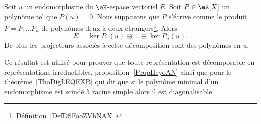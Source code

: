 \begin{theorem}       \label{ThoDecompNoyayzzMWod}
    Soit \( u\) un endomorphisme du \( \eK\)-espace vectoriel \( E\). Soit \( P\in\eK[X]\) un polynôme tel que \( P(u)=0\). Nous supposons que \( P\) s'écrive comme le produit \( P=P_1\ldots P_n\) de polynômes deux à deux étrangers\footnote{Définition~\ref{DefDSFooZVbNAX}.}. Alors
    \begin{equation}
        E=\ker P_1(u)\oplus\ldots\oplus\ker P_n(u).
    \end{equation}
    De plus les projecteurs associés à cette décomposition sont des polynômes en \( u\).
\end{theorem}
Ce résultat est utilisé pour prouver que toute représentation est décomposable en représentations irréductibles, proposition~\ref{PropHeyoAN} ainsi que pour le théorème~\ref{ThoDigLEQEXR} qui dit que si le polynôme minimal d'un endomorphisme est scindé à racine simple alors il est diagonalisable.

